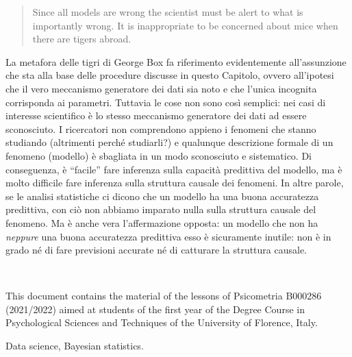 \documentclass[
  10pt,
  italian,
  a4paper,
  extrafontsizes,onecolumn,openright
  ]{memoir}
\makeatletter
\newcommand{\MemoirChapStyle}{daleif1}
\newcommand{\MemoirPageStyle}{Ruled}
\newlength\widthw %
\newcommand*{\SmallMargins}{
  \setlrmarginsandblock{1.5in}{1.5in}{*}
  \setmarginnotes{0.1in}{0.1in}{0.1in}
 \setulmarginsandblock{1.5in}{1in}{*}
  \checkandfixthelayout
  \ch@ngetext
  \clearpage
  \setlength{\widthw}{\textwidth+\marginparsep+\marginparwidth}
  \footnotesatfoot
  \chapterstyle{\MemoirChapStyle}  %
  \pagestyle{\MemoirPageStyle}
}
\newcommand{\LargeMargins}{\SmallMargins}
\newcommand{\evenpage}{
  \clearpage
  \strictpagecheck %
  \checkoddpage
  \ifoddpage
    \thispagestyle{empty}
    ~\\ %
    \newpage
  \else
  \fi
}
\theoremstyle{definition}
\theoremstyle{definition}
\theoremstyle{definition}
\theoremstyle{definition}
\theoremstyle{remark}
\makeatother
\begin{document}
\begin{quote}
Since all models are wrong the scientist must be alert to what is importantly wrong. It is inappropriate to be concerned about mice when there are tigers abroad.
\end{quote}

La metafora delle tigri di George Box fa riferimento evidentemente all'assunzione che sta alla base delle procedure discusse in questo Capitolo, ovvero all'ipotesi che il vero meccanismo generatore dei dati sia noto e che l'unica incognita corrisponda ai parametri. Tuttavia le cose non sono così semplici: nei casi di interesse scientifico è lo stesso meccanismo generatore dei dati ad essere sconosciuto. I ricercatori non comprendono appieno i fenomeni che stanno studiando (altrimenti perché studiarli?) e qualunque descrizione formale di un fenomeno (modello) è sbagliata in un modo sconosciuto e sistematico. Di conseguenza, è ``facile'' fare inferenza sulla capacità predittiva del modello, ma è molto difficile fare inferenza sulla struttura causale dei fenomeni. In altre parole, se le analisi statistiche ci dicono che un modello ha una buona accuratezza predittiva, con ciò non abbiamo imparato nulla sulla struttura causale del fenomeno. Ma è anche vera l'affermazione opposta: un modello che non ha \emph{neppure} una buona accuratezza predittiva esso è sicuramente inutile: non è in grado né di fare previsioni accurate né di catturare la struttura causale.



\backmatter
\SmallMargins

\printbibliography
\onecolumn




\cleardoublepage
\LargeMargins
\listoffigures







\evenpage
\SmallMargins
\thispagestyle{empty}

\begin{normalsize}

\begin{description}

\item[Abstract]
This document contains the material of the lessons of Psicometria B000286 (2021/2022) aimed at students of the first year of the Degree Course in Psychological Sciences and Techniques of the University of Florence, Italy.
\item[Keywords]
Data science, Bayesian statistics.
~\\

\end{description}

\end{normalsize}
\end{document}
